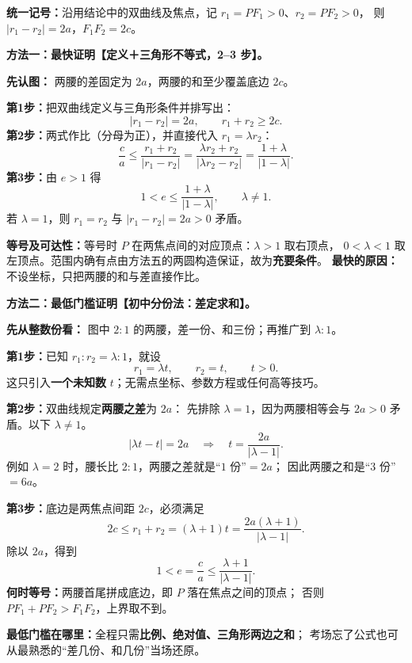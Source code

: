 \clearpage
\begin{proofbox}
\textbf{统一记号：}沿用结论中的双曲线及焦点，记 $r_1=PF_1>0$、$r_2=PF_2>0$，
则 $|r_1-r_2|=2a$，$F_1F_2=2c$。

\medskip
\textbf{方法一：最快证明【定义＋三角形不等式，2--3 步】。}
\begin{center}\end{center}
\textbf{先认图：} 两腰的差固定为 $2a$，两腰的和至少覆盖底边 $2c$。

\textbf{第1步：}把双曲线定义与三角形条件并排写出：
\[
\boxed{|r_1-r_2|=2a},\qquad
\boxed{r_1+r_2\ge2c}.
\]
\textbf{第2步：}两式作比（分母为正），并直接代入 $r_1=\lambda r_2$：
\[
\frac ca
\le\frac{r_1+r_2}{|r_1-r_2|}
=\frac{\lambda r_2+r_2}{|\lambda r_2-r_2|}
=\boxed{\frac{1+\lambda}{|1-\lambda|}}.
\]
\textbf{第3步：}由 $e>1$ 得
\[
\boxed{1<e\le\frac{1+\lambda}{|1-\lambda|}},\qquad \lambda\ne1.
\]
若 $\lambda=1$，则 $r_1=r_2$ 与 $|r_1-r_2|=2a>0$ 矛盾。

\textbf{等号及可达性：}等号时 $P$ 在两焦点间的对应顶点：$\lambda>1$ 取右顶点，
$0<\lambda<1$ 取左顶点。范围内确有点由方法五的两圆构造保证，故为\textbf{充要条件}。
\textbf{最快的原因：}不设坐标，只把两腰的和与差直接作比。
\end{proofbox}

\clearpage
\begin{proofbox}
\textbf{方法二：最低门槛证明【初中分份法：差定求和】。}
\begin{center}\end{center}
\textbf{先从整数份看：} 图中 $2:1$ 的两腰，差一份、和三份；再推广到 $\lambda:1$。

\textbf{第1步：}已知 $r_1:r_2=\lambda:1$，就设
\[
r_1=\lambda t,\qquad r_2=t,\qquad t>0.
\]
这只引入\textbf{一个未知数} $t$；无需点坐标、参数方程或任何高等技巧。

\textbf{第2步：}双曲线规定\textbf{两腰之差}为 $2a$：
先排除 $\lambda=1$，因为两腰相等会与 $2a>0$ 矛盾。以下 $\lambda\ne1$。
\[
|\lambda t-t|=2a
\quad\Longrightarrow\quad
\boxed{t=\frac{2a}{|\lambda-1|}}.
\]
例如 $\lambda=2$ 时，腰长比 $2:1$，两腰之差就是“$1$ 份”$=2a$；
因此两腰之和是“$3$ 份”$=6a$。

\textbf{第3步：}底边是两焦点间距 $2c$，必须满足
\[
2c\le r_1+r_2=(\lambda+1)t
=\frac{2a(\lambda+1)}{|\lambda-1|}.
\]
除以 $2a$，得到
\[
\boxed{1<e=\frac ca\le\frac{\lambda+1}{|\lambda-1|}}.
\]
\textbf{何时等号：}两腰首尾拼成底边，即 $P$ 落在焦点之间的顶点；
否则 $PF_1+PF_2>F_1F_2$，上界取不到。

\textbf{最低门槛在哪里：}全程只需\textbf{比例、绝对值、三角形两边之和}；
考场忘了公式也可从最熟悉的“差几份、和几份”当场还原。
\end{proofbox}

